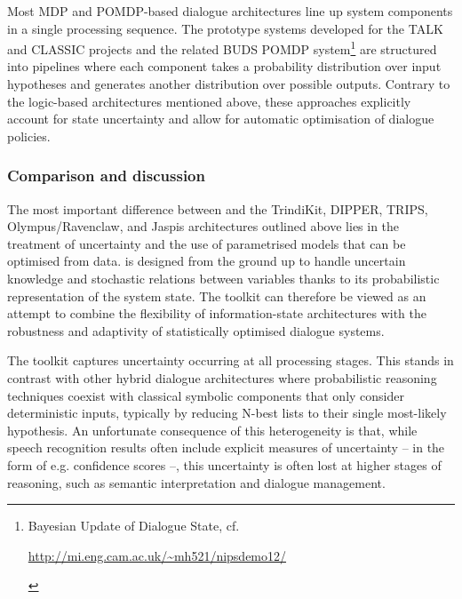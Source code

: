 Most MDP and POMDP-based dialogue architectures line up system components in a single processing sequence. The prototype systems developed for the TALK and CLASSIC projects \citep{Henderson:2008,Lemon:2012} and the related BUDS POMDP system\footnote{Bayesian Update of Dialogue State, cf. \begin{scriptsize}\url{http://mi.eng.cam.ac.uk/~mh521/nipsdemo12/}\end{scriptsize}} are structured into pipelines where each component takes a probability distribution over input hypotheses and generates another distribution over possible outputs.  Contrary to the logic-based architectures mentioned above, these approaches explicitly account for state uncertainty and allow for automatic optimisation of dialogue policies. 


\subsubsection*{Comparison and discussion}

The most important difference between \opendial and the TrindiKit, DIPPER, TRIPS, Olympus/Ravenclaw, and Jaspis architectures outlined above lies in the treatment of uncertainty and the use of parametrised models that can be optimised from data. \opendial is designed from the ground up to handle uncertain knowledge and stochastic relations between variables thanks to its probabilistic representation of the system state. The \opendial toolkit can therefore be viewed as an attempt to combine the flexibility of information-state architectures with the robustness and adaptivity of statistically optimised dialogue systems.  

The \opendial toolkit captures uncertainty occurring at all processing stages.  This stands in contrast with other hybrid dialogue architectures where probabilistic reasoning techniques coexist with classical symbolic components that only consider deterministic inputs, typically by reducing N-best lists to their single most-likely hypothesis. An unfortunate consequence of this heterogeneity is that, while speech recognition results often include explicit measures of uncertainty -- in the form of e.g. confidence scores --, this uncertainty is often lost at higher stages of reasoning, such as semantic interpretation and dialogue management. 

